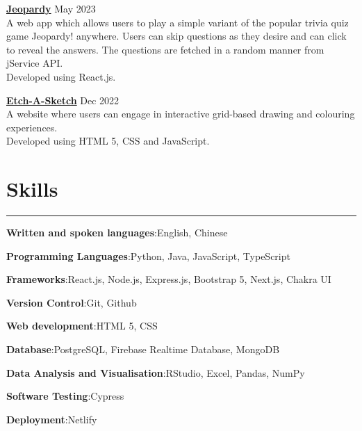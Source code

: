 \documentclass[letterpaper,11pt]{article}
\begin{document}
    \vspace{0.5em}
    \textbf{\href {https://github.com/tjch-o/jeopardy}{Jeopardy}} \hfill May 2023
    \\
    A web app which allows users to play a simple variant of the popular trivia quiz game Jeopardy! 
    anywhere. Users can skip questions as they desire and can click to reveal the answers. The 
    questions are fetched in a random manner from jService API.
    \\
    Developed using React.js.

    \vspace{0.5em}
    \textbf{\href {https://github.com/tjch-o/the-odin-project/tree/main/odin-etch-a-sketch}
    {Etch-A-Sketch}} \hfill Dec 2022
    \\
    A website where users can engage in interactive grid-based drawing and colouring experiences. 
    \\ 
    Developed using HTML 5, CSS and JavaScript.
     
    \section{Skills}
    \vspace{-0.5em}
    \hrule 
    \vspace{0.5em}
    \textbf{Written and spoken languages}:\space English, Chinese

    \vspace{0.5em}
    \textbf{Programming Languages}:\space Python, Java, JavaScript, TypeScript

    \vspace{0.5em}
    \textbf{Frameworks}:\space React.js, Node.js, Express.js, Bootstrap 5, Next.js, Chakra UI

    \vspace{0.5em}
    \textbf{Version Control}:\space Git, Github

    \vspace{0.5em}
    \textbf{Web development}:\space HTML 5, CSS

    \vspace{0.5em}
    \textbf{Database}:\space PostgreSQL, Firebase Realtime Database, MongoDB

    \vspace{0.5em}
    \textbf{Data Analysis and Visualisation}:\space RStudio, Excel, Pandas, NumPy 

    \vspace{0.5em}
    \textbf{Software Testing}:\space Cypress

    \vspace{0.5em}
    \textbf{Deployment}:\space Netlify
\end{document}
